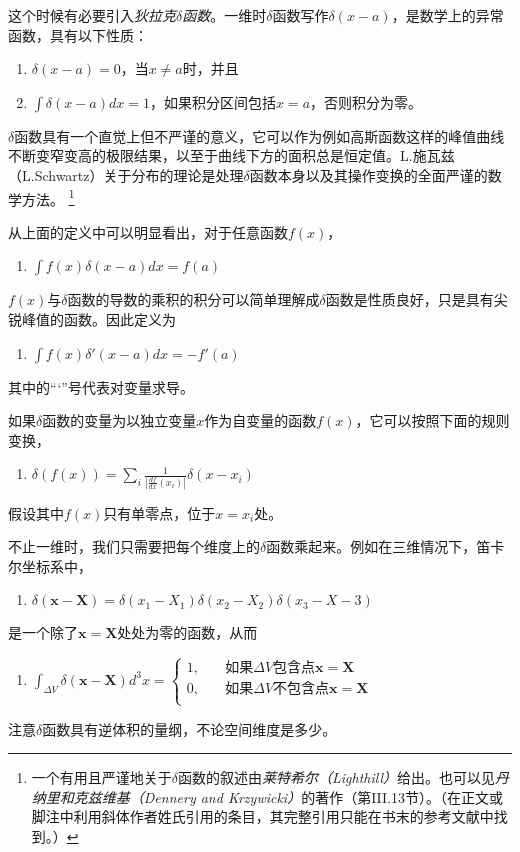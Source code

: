 \documentclass[12pt]{book}
\numberwithin{equation}{chapter}
\numberwithin{figure}{chapter}
\numberwithin{footnote}{page}
\begin{document}
{\small 这个时候有必要引入\textit{狄拉克$\delta$函数}。一维时$\delta$函数写作$\delta(x-a)$，是数学上的异常函数，具有以下性质：
\begin{enumerate}
    \item $\delta(x-a)=0$，当$x\neq a$时，并且
    \item $\int \delta(x-a) dx=1$，如果积分区间包括$x=a$，否则积分为零。
\end{enumerate}
$\delta$函数具有一个直觉上但不严谨的意义，它可以作为例如高斯函数这样的峰值曲线不断变窄变高的极限结果，以至于曲线下方的面积总是恒定值。L.施瓦兹（L.Schwartz）关于分布的理论是处理$\delta$函数本身以及其操作变换的全面严谨的数学方法。
\footnote{一个有用且严谨地关于$\delta$函数的叙述由\textit{莱特希尔（Lighthill）}给出。也可以见\textit{丹纳里和克兹维基（Dennery and Krzywicki）}的著作（第III.13节）。（在正文或脚注中利用斜体作者姓氏引用的条目，其完整引用只能在书末的参考文献中找到。）}

从上面的定义中可以明显看出，对于任意函数$f(x)$，
\begin{enumerate}[resume]
    \item $\int f(x)\delta(x-a)dx=f(a)$
\end{enumerate}
$f(x)$与$\delta$函数的导数的乘积的积分可以简单理解成$\delta$函数是性质良好，只是具有尖锐峰值的函数。因此定义为
\begin{enumerate}[resume]
    \item $\int f(x)\delta'(x-a)dx=-f'(a)$
\end{enumerate}
其中的“‘”号代表对变量求导。

如果$\delta$函数的变量为以独立变量$x$作为自变量的函数$f(x)$，它可以按照下面的规则变换，
\begin{enumerate}[resume]
    \item $\delta(f(x))=\sum_i \frac{1}{|\frac{df}{dx}(x_i)|}\delta(x-x_i)$
\end{enumerate}
假设其中$f(x)$只有单零点，位于$x=x_i$处。

不止一维时，我们只需要把每个维度上的$\delta$函数乘起来。例如在三维情况下，笛卡尔坐标系中，
\begin{enumerate}[resume]
    \item $\delta(\mathbf{x}-\mathbf{X})=\delta(x_1-X_1)\delta(x_2-X_2)\delta(x_3-X-3)$
\end{enumerate}
是一个除了$\mathbf{x}=\mathbf{X}$处处为零的函数，从而
\begin{enumerate}[resume]
    \item 
  
    $\int_{\Delta V}\delta(\mathbf{x}-\mathbf{X})d^3x=\left\{
    \begin{aligned}
        1,&\quad \mbox{如果}\Delta V\mbox{包含点}\mathbf{x}=\mathbf{X}\\
        0,&\quad \mbox{如果}\Delta V\mbox{不包含点}\mathbf{x}=\mathbf{X}\\
    \end{aligned}\right.$
\end{enumerate}
注意$\delta$函数具有逆体积的量纲，不论空间维度是多少。

}
\end{document}
